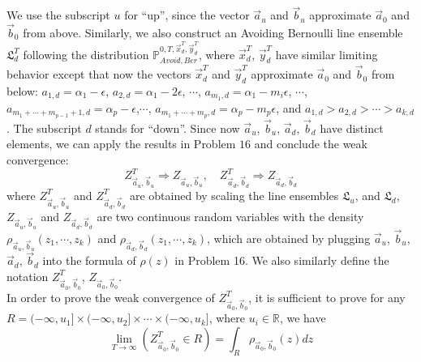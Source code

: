 \documentclass[12pt]{article}
\begin{document}
We use the subscript $u$ for ``up'', since the vector $\vec{a}_{u}$ and $\vec{b}_{u}$ approximate $\vec{a}_{0}$ and $\vec{b}_{0}$ from above. Similarly, we also construct an Avoiding Bernoulli line ensemble $\mathfrak{L}_{d}^{T}$ following the distribution $\mathbb{P}_{Avoid,Ber}^{0,T,\vec{x}^{T}_{d},\vec{y}^{T}_{d}}$, where $\vec{x}^{T}_{d}$, $\vec{y}^{T}_{d}$ have similar limiting behavior except that now the vectors $\vec{x}^{T}_{d}$ and $\vec{y}^{T}_{d}$ approximate $\vec{a}_{0}$ and $\vec{b}_{0}$ from below: $a_{1,d}=\alpha_{1}-\epsilon$, $a_{2,d}=\alpha_{1}-2\epsilon$, $\cdots$, $a_{m_{1},d}=\alpha_{1}-m_{i}\epsilon$, $\cdots$, $a_{m_{1}+\cdots+m_{p-1}+1,d}=\alpha_{p}-\epsilon$,$\cdots$, $a_{m_{1}+\cdots+m_{p},d}=\alpha_{p}-m_{p}\epsilon$, and $a_{1,d}>a_{2,d}>\cdots>a_{k,d}$. The subscript $d$ stands for ``down''. Since now $\vec{a}_{u}$, $\vec{b}_{u}$, $\vec{a}_{d}$, $\vec{b}_{d}$ have distinct elements, we can apply the results in Problem $16$ and conclude the weak convergence:
$$Z^{T}_{\vec{a}_{u}, \vec{b}_{u}}\Rightarrow Z_{\vec{a}_{u}, \vec{b}_{u}},\quad Z^{T}_{\vec{a}_{d}, \vec{b}_{d}}\Rightarrow Z_{\vec{a}_{d}, \vec{b}_{d}} $$
where $Z_{\vec{a}_{u}, \vec{b}_{u}}^{T}$ and $Z_{\vec{a}_{d}, \vec{b}_{d}}^{T}$ are obtained by scaling the line ensembles $\mathfrak{L}_{u}$, and $\mathfrak{L}_{d}$, $Z_{\vec{a}_{u}, \vec{b}_{u}}$ and $Z_{\vec{a}_{d}, \vec{b}_{d}}$ are two continuous random variables with the density $\rho_{\vec{a}_{u}, \vec{b}_{u}}(z_{1},\cdots,z_{k})$ and $\rho_{\vec{a}_{d}, \vec{b}_{d}}(z_{1},\cdots,z_{k})$, which are obtained by plugging $\vec{a}_{u}$, $\vec{b}_{u}$, $\vec{a}_{d}$, $\vec{b}_{d}$ into the formula of $\rho(z)$ in Problem 16. We also similarly define the notation $Z^{T}_{\vec{a}_{0},\vec{b}_{0}}$, $Z_{\vec{a}_{0},\vec{b}_{0}}$. \\
In order to prove the weak convergence of $Z^{T}_{\vec{a}_{0},\vec{b}_{0}}$, it is sufficient to prove for any $R=(-\infty,u_{1}]\times(-\infty,u_{2}]\times\cdots\times(-\infty,u_{k}]$, where $u_{i}\in\mathbb{R}$, we have $$\lim_{T\rightarrow\infty}(Z^{T}_{\vec{a}_{0},\vec{b}_{0}}\in R)=\int_{R}\rho_{\vec{a}_{0},\vec{b}_{0}}(z)dz$$
\end{document}
